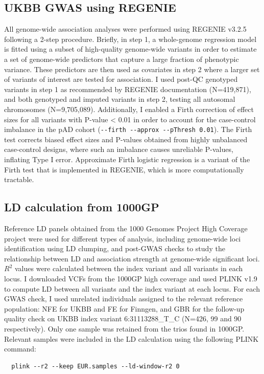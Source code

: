 \subsection{UKBB GWAS using REGENIE}
All genome-wide association analyses were performed using REGENIE v3.2.5 \cite{Mbatchou2021-qm} following a 2-step procedure. Briefly, in step 1, a whole-genome regression model is fitted using a subset of high-quality genome-wide variants in order to estimate a set of genome-wide predictors that capture a large fraction of phenotypic variance. These predictors are then used as covariates in step 2 where a larger set of variants of interest are tested for association.
I used post-QC genotyped variants in step 1 as recommended by REGENIE documentation (N=419,871), and both genotyped and imputed variants in step 2, testing all autosomal chromosomes (N=9,705,089). Additionally, I enabled a Firth correction of effect sizes for all variants with P-value < 0.01 in order to account for the case-control imbalance in the pAD cohort (\Verb+--firth --approx --pThresh 0.01+). The Firth test corrects biased effect sizes and P-values obtained from highly unbalanced case-control designs, where such an imbalance causes unreliable P-values, inflating Type I error. Approximate Firth logistic regression is a variant of the Firth test that is implemented in REGENIE, which is more computationally tractable. 

\subsection{LD calculation from 1000GP}
Reference LD panels obtained from the 1000 Genomes Project High Coverage project \cite{1000gphc} were used for different types of analysis, including genome-wide loci identification using LD clumping, and post-GWAS checks to study the relationship between LD and association strength at genome-wide significant loci. $R^{2}$ values were calculated between the index variant and all variants in each locus. I downloaded VCFs from the 1000GP high coverage and used PLINK v1.9 to compute LD between all variants and the index variant at each locus. For each GWAS check, I used unrelated individuals assigned to the relevant reference population: NFE for UKBB and FE for Finngen, and GBR for the follow-up quality check on UKBB index variant 6:31113288\_T\_C (N=426, 99 and 90 respectively). Only one sample was retained from the trios found in 1000GP. Relevant samples were included in the LD calculation using the following PLINK command:
\begin{verbatim}
  plink --r2 --keep EUR.samples --ld-window-r2 0 
\end{verbatim}


